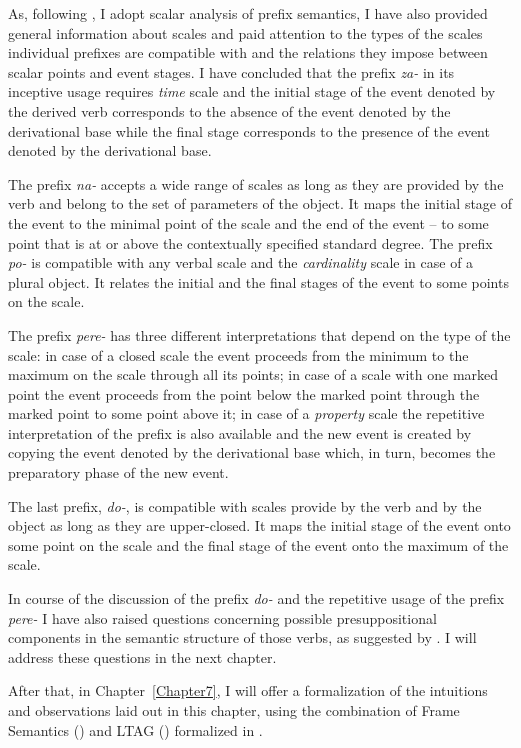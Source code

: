 As, following \citet{Kagan:book}, I adopt scalar analysis of prefix semantics, I have also provided general information about scales and paid attention to the types of the scales individual prefixes are compatible with and the relations they impose between scalar points and event stages. I have concluded that the prefix \textit{za-} in its inceptive usage requires \textit{time} scale and the initial stage of the event denoted by the derived verb corresponds to the absence of the event denoted by the derivational base while the final stage corresponds to the presence of the event denoted by the derivational base. 

The prefix \textit{na-} accepts a wide range of scales as long as they are provided by the verb and belong to the set of parameters of the object. It maps the initial stage of the event to the minimal point of the scale and the end of the event -- to some point that is at or above the contextually specified standard degree. The prefix \textit{po-} is compatible with any verbal scale and the \textit{cardinality} scale in case of a plural object. It relates the initial and the final stages of the event to some points on the scale. 

The prefix \textit{pere-} has three different interpretations that depend on the type of the scale: in case of a closed scale the event proceeds from the minimum to the maximum on the scale through all its points; in case of a scale with one marked point the event proceeds from the point below the marked point through the marked point to some point above it; in case of a \textit{property} scale the repetitive interpretation of the prefix is also available and the new event is created by copying the event denoted by the derivational base which, in turn, becomes the preparatory phase of the new event. 

The last prefix, \textit{do-}, is compatible with scales provide by the verb and by the object as long as they are upper-closed. It maps the initial stage of the event onto some point on the scale and the final stage of the event onto the maximum of the scale. 

In course of the discussion of the prefix \textit{do-} and the repetitive usage of the prefix \textit{pere-} I have also raised questions concerning possible presuppositional components in the semantic structure of those verbs, as suggested by \citet{Kagan:book}. I will address these questions in the next chapter.

After that, in Chapter~\ref{Chapter7}, I will offer a formalization of the intuitions and observations laid out in this chapter, using the combination of Frame Semantics (\citealt{Fillmore:82}) and LTAG (\citealt{JoshiSchabes:97}) formalized in \citealt{KallmeyerOsswald:13}. 


